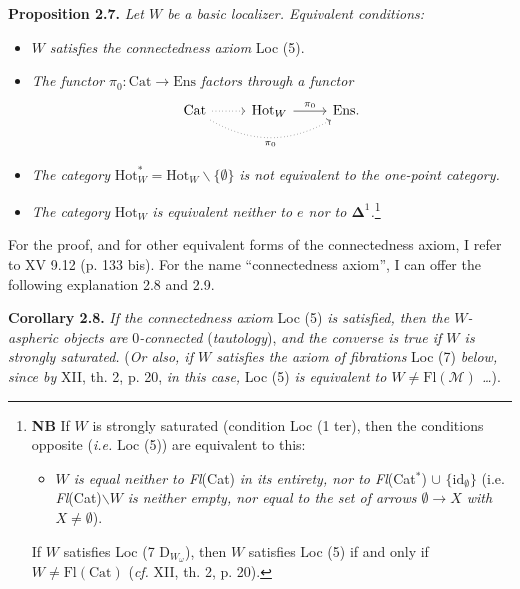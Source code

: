 \textbf{Proposition 2.7.} \textit{Let $W$ be a basic localizer. Equivalent conditions:}
\begin{itemize}[leftmargin=3em]
\item[a)] $W$ \textit{satisfies the connectedness axiom} Loc (5).
\item[b)] \textit{The functor} $\pi_0 : \mathrm{Cat} \longrightarrow \mathrm{Ens}$ \textit{factors through a functor}
\[
\begin{tikzcd}
\mathrm{Cat} \arrow[r, dotted] \arrow[rr, dotted, bend right, "\pi_0"'] & \mathrm{Hot}_W \arrow[r, "\pi_0"] & \mathrm{Ens}.
\end{tikzcd}
\]
\item[c)] \textit{The category} $\mathrm{Hot}^*_W = \mathrm{Hot}_W\backslash\{\emptyset\}$ \textit{is not equivalent to the one-point category.}
\item[c$'$)] \textit{The category} $\mathrm{Hot}_W$ \textit{is equivalent neither to $e$ nor to $\boldsymbol{\Delta}^1$.}\footnote{\textbf{NB} If $W$ is strongly saturated (condition Loc (1 ter), then the conditions opposite (\textit{i.e.} Loc (5)) are equivalent to this: %
\begin{itemize}[leftmargin=2.5em]
\item[d)] \textit{$W$ is equal neither to Fl}(Cat) \textit{in its entirety, nor to Fl}(Cat$^*$) $\cup$ $\{\mathrm{id}_\emptyset\}$ (i.e. \textit{Fl}(Cat)$\backslash W$ \textit{is neither empty, nor equal to the set of arrows $\emptyset \longrightarrow X$ with $X \neq \emptyset$}).
\end{itemize}
If $W$ satisfies Loc (7 D$_{W_\omega}$), then $W$ satisfies Loc (5) if and only if $W \neq \mathrm{Fl}(\mathrm{Cat})$ (\textit{cf.} XII, th. 2, p. 20).}
\end{itemize}

For the proof, and for other equivalent forms of the connectedness axiom, I refer to XV 9.12 (p. 133 bis). For the name ``connectedness axiom'', I can offer the following explanation 2.8 and 2.9.

\textbf{Corollary 2.8.} \textit{If the connectedness axiom} Loc (5) \textit{is satisfied, then the $W$-aspheric objects are} 0\textit{-connected} (\textit{tautology}), \textit{and the converse is true if $W$ is strongly saturated.} (\textit{Or also, if $W$ satisfies the axiom of fibrations} Loc (7) \textit{below, since by} XII, th. 2, p. 20, \textit{in this case,} Loc (5) \textit{is equivalent to $W \neq \mathrm{Fl}(\mathcal{M})$ \ldots}).

